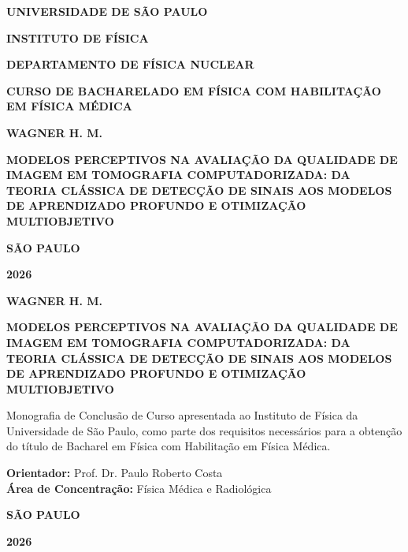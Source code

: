 \documentclass[
  12pt,
  a4paper,
  oneside
]{report}
\newcommand{\tccuniversidade}{UNIVERSIDADE DE SÃO PAULO}
\newcommand{\tccinstituto}{INSTITUTO DE FÍSICA}
\newcommand{\tccdepartamento}{DEPARTAMENTO DE FÍSICA NUCLEAR}
\newcommand{\tcccurso}{CURSO DE BACHARELADO EM FÍSICA COM HABILITAÇÃO EM FÍSICA MÉDICA}
\newcommand{\tccautor}{WAGNER H. M.}
\newcommand{\tcctitulo}{MODELOS PERCEPTIVOS NA AVALIAÇÃO DA QUALIDADE DE IMAGEM EM TOMOGRAFIA COMPUTADORIZADA: DA TEORIA CLÁSSICA DE DETECÇÃO DE SINAIS AOS MODELOS DE APRENDIZADO PROFUNDO E OTIMIZAÇÃO MULTIOBJETIVO}
\newcommand{\tccorientador}{Prof. Dr. Paulo Roberto Costa}
\newcommand{\tccarea}{Física Médica e Radiológica}
\newcommand{\tcccidade}{SÃO PAULO}
\newcommand{\tccano}{2026}
\begin{document}
\pagestyle{empty}

\begin{center}
  {\bfseries\large \tccuniversidade \par}
  {\bfseries\large \tccinstituto \par}
  {\bfseries\large \tccdepartamento \par}
  {\bfseries\normalsize \tcccurso \par}

  \vspace{3.5cm}

  {\bfseries\Large \tccautor \par}

  \vspace{3.5cm}

  {\bfseries\large \tcctitulo \par}

  \vfill

  {\bfseries\large \tcccidade \par}
  {\bfseries\large \tccano \par}
\end{center}
\clearpage

\begin{center}
  {\bfseries\Large \tccautor \par}

  \vspace{3.5cm}

  {\bfseries\large \tcctitulo \par}

  \vspace{2.5cm}

  \begin{flushright}
    \begin{minipage}{0.55\textwidth}
      \small
      Monografia de Conclusão de Curso apresentada ao Instituto de Física da Universidade de São Paulo, como parte dos requisitos necessários para a obtenção do título de Bacharel em Física com Habilitação em Física Médica.
      
      \vspace{0.5cm}
      \textbf{Orientador:} \tccorientador\\
      \textbf{Área de Concentração:} \tccarea
    \end{minipage}
  \end{flushright}

  \vfill

  {\bfseries\large \tcccidade \par}
  {\bfseries\large \tccano \par}
\end{center}
\clearpage
\end{document}
